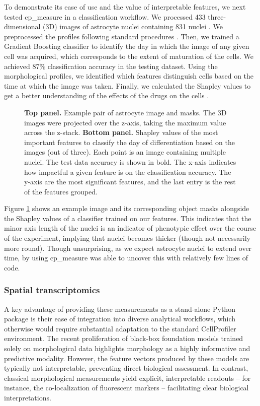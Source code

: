 \documentclass{article}
\begin{document}
To demonstrate its ease of use and the value of interpretable features, we next tested cp\_measure in a classification workflow. We processed 433 three-dimensional (3D) images of astrocyte nuclei containing 831 nuclei \citep{kalinin3DCellNuclear2018}. We preprocessed the profiles following standard procedures \citep{caicedoDataanalysisStrategiesImagebased2017}. Then, we trained a Gradient Boosting classifier to identify the day in which the image of any given cell was acquired, which corresponds to the extent of maturation of the cells. We achieved 87\% classification accuracy in the testing dataset. Using the morphological profiles, we identified which features distinguish cells based on the time at which the image was taken. Finally, we calculated the Shapley values to get a better understanding of the effects of the drugs on the cells \citep{sundararajanManyShapleyValues2020}.

\begin{figure}[htbp]
\centering

\caption{\label{fig:astrocytes}\textbf{Top panel.} Example pair of astrocyte image and masks. The 3D images were projected over the z-axis, taking the maximum value across the z-stack. \textbf{Bottom panel.} Shapley values of the most important features to classify the day of differentiation based on the images (out of three). Each point is an image containing multiple nuclei. The test data accuracy is shown in bold. The x-axis indicates how impactful a given feature is on the classification accuracy. The y-axis are the most significant features, and the last entry is the rest of the features grouped.}
\end{figure}

Figure \ref{fig:astrocytes} shows an example image and its corresponding object masks alongside the Shapley values of a classifier trained on our features. This indicates that the minor axis length of the nuclei is an indicator of phenotypic effect over the course of the experiment, implying that nuclei becomes thicker (though not necessarily more round). Though unsurprising, as we expect astrocyte nuclei to extend over time, by using cp\_measure was able to uncover this with relatively few lines of code.
\subsubsection{Spatial transcriptomics}
\label{sec:org5711d86}
A key advantage of providing these measurements as a stand-alone Python package is their ease of integration into diverse analytical workflows, which otherwise would require substantial adaptation to the standard CellProfiler environment. The recent proliferation of black-box foundation models trained solely on morphological data highlights morphology as a highly informative and predictive modality. However, the feature vectors produced by these models are typically not interpretable, preventing direct biological assessment. In contrast, classical morphological measurements yield explicit, interpretable readouts -- for instance, the co-localization of fluorescent markers -- facilitating clear biological interpretations.
\end{document}
